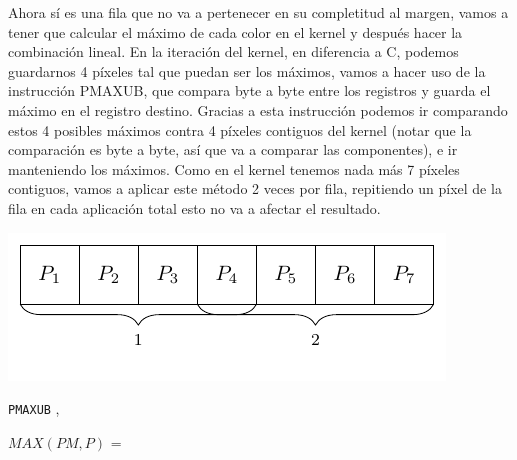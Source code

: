 Ahora sí es una fila que no va a pertenecer en su completitud al margen, vamos a tener que calcular el máximo de cada color en el kernel y después hacer la combinación lineal. En la iteración del kernel, en diferencia a C, podemos guardarnos 4 píxeles tal que puedan ser los máximos, vamos a hacer uso de la instrucción PMAXUB, que compara byte a byte entre los registros y guarda el máximo en el registro destino. Gracias a esta instrucción podemos ir comparando estos 4 posibles máximos contra 4 píxeles contiguos del kernel (notar que la comparación es byte a byte, así que va a comparar las componentes), e ir manteniendo los máximos. Como en el kernel tenemos nada más 7 píxeles contiguos, vamos a aplicar este método 2 veces por fila, repitiendo un píxel de la fila en cada aplicación total esto no va a afectar el resultado.

\begin{minipage}{\linewidth}
	\begin{center} 
		\includegraphics[]{img/max/filaKernel.pdf}
	\end{center}
\end{minipage}

\begin{minipage}{\linewidth}
	\begin{center}
		 

		 

		\texttt{PMAXUB} ,  \hfill

		 

		$MAX(PM,P)$ = 
	\end{center}
\end{minipage}



